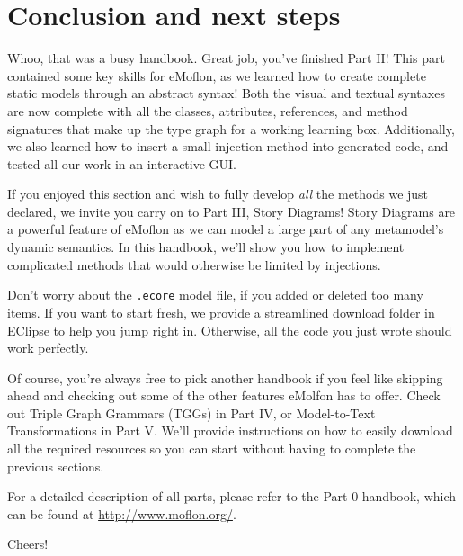 \newpage
\section{Conclusion and next steps}
\genHeader
\hypertarget{conclusion}{}

\vspace{0.5cm}

Whoo, that was a busy handbook. Great job, you've finished Part II! This part contained some key skills for eMoflon, as we learned how to create complete
static models through an abstract syntax! Both the visual and textual syntaxes are now complete with all the classes, attributes, references, and
method signatures that make up the type graph for a working learning box. Additionally, we also learned how to insert a small injection method into generated
code, and tested all our work in an interactive GUI.

If you enjoyed this section and wish to fully develop \emph{all} the methods we just declared, we invite you carry on to Part III, Story
Diagrams! Story Diagrams are a powerful feature of eMoflon as we can model a large part of any metamodel's dynamic semantics. In this handbook, we'll show you
how to implement complicated methods that would otherwise be limited by injections.

Don't worry about the \texttt{.ecore} model file, if you added or deleted too many items. If you want to start fresh, we provide a streamlined download folder
in EClipse to help you jump right in. Otherwise, all the code you just wrote should work perfectly.

Of course, you're always free to pick another handbook if you feel like skipping ahead and checking out some of the other features eMolfon has to offer. Check
out Triple Graph Grammars (TGGs)  in Part IV, or Model-to-Text Transformations in Part V. We'll provide instructions on how to easily download all the
required resources so you can start without having to complete the previous sections.

For a detailed description of all parts, please refer to the Part 0 handbook, which can be found at \href{http://www.moflon.org/ }{http://www.moflon.org/}.

\vspace{1.0cm}

Cheers!